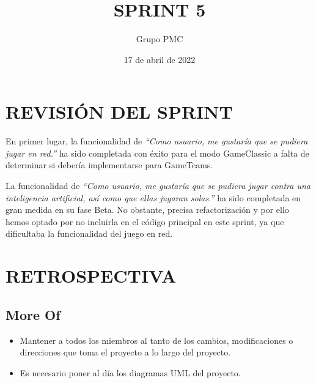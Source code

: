 \documentclass{article}
\title{SPRINT 5}
\date{17 de abril de 2022}
\author{Grupo PMC}
\begin{document}
\maketitle

\section{REVISIÓN DEL SPRINT}
En primer lugar, la funcionalidad de \emph{``Como usuario, me gustaría
que se pudiera jugar en red.''} ha sido completada con éxito para el
modo GameClassic a falta de determinar si debería implementarse para
GameTeams.

La funcionalidad de \emph{``Como usuario, me gustaría que se pudiera
jugar contra una inteligencia artificial, así como que ellas jugaran
solas.''} ha sido completada en gran medida en su fase Beta. No
obstante, precisa refactorización y por ello hemos optado por no
incluirla en el código principal en este sprint, ya que dificultaba la
funcionalidad del juego en red.

\section{RETROSPECTIVA}

\subsection{More Of}
\begin{itemize}
\item
  Mantener a todos los miembros al tanto de los cambios, modificaciones
  o direcciones que toma el proyecto a lo largo del proyecto.
\item
  Es necesario poner al día los diagramas UML del proyecto.
\end{itemize}
\end{document}
